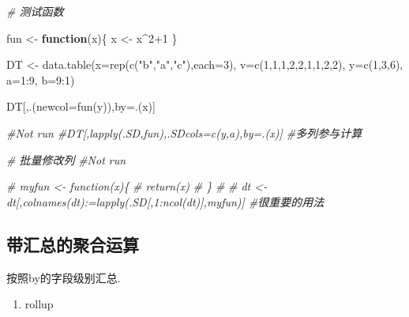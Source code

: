 \documentclass[
]{book}
\newenvironment{Shaded}{\begin{snugshade}}{\end{snugshade}}
\newcommand{\AttributeTok}[1]{\textcolor[rgb]{0.77,0.63,0.00}{#1}}
\newcommand{\CommentTok}[1]{\textcolor[rgb]{0.56,0.35,0.01}{\textit{#1}}}
\newcommand{\ControlFlowTok}[1]{\textcolor[rgb]{0.13,0.29,0.53}{\textbf{#1}}}
\newcommand{\DecValTok}[1]{\textcolor[rgb]{0.00,0.00,0.81}{#1}}
\newcommand{\FunctionTok}[1]{\textcolor[rgb]{0.00,0.00,0.00}{#1}}
\newcommand{\NormalTok}[1]{#1}
\newcommand{\OtherTok}[1]{\textcolor[rgb]{0.56,0.35,0.01}{#1}}
\newcommand{\SpecialCharTok}[1]{\textcolor[rgb]{0.00,0.00,0.00}{#1}}
\newcommand{\StringTok}[1]{\textcolor[rgb]{0.31,0.60,0.02}{#1}}
\providecommand{\tightlist}{%
  \setlength{\itemsep}{0pt}\setlength{\parskip}{0pt}}
\begin{document}
\begin{Shaded}
\begin{Highlighting}[]
\CommentTok{\# 测试函数}

\NormalTok{fun }\OtherTok{\textless{}{-}} \ControlFlowTok{function}\NormalTok{(x)\{}
\NormalTok{  x }\OtherTok{\textless{}{-}}\NormalTok{ x}\SpecialCharTok{\^{}}\DecValTok{2}\SpecialCharTok{+}\DecValTok{1}
\NormalTok{\}}

\NormalTok{DT }\OtherTok{\textless{}{-}}  \FunctionTok{data.table}\NormalTok{(}\AttributeTok{x=}\FunctionTok{rep}\NormalTok{(}\FunctionTok{c}\NormalTok{(}\StringTok{"b"}\NormalTok{,}\StringTok{"a"}\NormalTok{,}\StringTok{"c"}\NormalTok{),}\AttributeTok{each=}\DecValTok{3}\NormalTok{), }\AttributeTok{v=}\FunctionTok{c}\NormalTok{(}\DecValTok{1}\NormalTok{,}\DecValTok{1}\NormalTok{,}\DecValTok{1}\NormalTok{,}\DecValTok{2}\NormalTok{,}\DecValTok{2}\NormalTok{,}\DecValTok{1}\NormalTok{,}\DecValTok{1}\NormalTok{,}\DecValTok{2}\NormalTok{,}\DecValTok{2}\NormalTok{), }\AttributeTok{y=}\FunctionTok{c}\NormalTok{(}\DecValTok{1}\NormalTok{,}\DecValTok{3}\NormalTok{,}\DecValTok{6}\NormalTok{), }\AttributeTok{a=}\DecValTok{1}\SpecialCharTok{:}\DecValTok{9}\NormalTok{, }\AttributeTok{b=}\DecValTok{9}\SpecialCharTok{:}\DecValTok{1}\NormalTok{)}

\NormalTok{DT[,.(}\AttributeTok{newcol=}\FunctionTok{fun}\NormalTok{(y)),by}\OtherTok{=}\NormalTok{.(x)]}

\CommentTok{\#Not run}
\CommentTok{\#DT[,lapply(.SD,fun),.SDcols=c(\textquotesingle{}y\textquotesingle{},\textquotesingle{}a\textquotesingle{}),by=.(x)] \#多列参与计算}


\CommentTok{\# 批量修改列}
\CommentTok{\#Not run}

\CommentTok{\# myfun \textless{}{-} function(x)\{}
\CommentTok{\#   return(x)}
\CommentTok{\# \}}
\CommentTok{\# }
\CommentTok{\# dt \textless{}{-} dt[,colnames(dt):=lapply(.SD[,1:ncol(dt)],myfun)] \#很重要的用法}
\end{Highlighting}
\end{Shaded}

\hypertarget{ux5e26ux6c47ux603bux7684ux805aux5408ux8fd0ux7b97}{%
\subsection{带汇总的聚合运算}\label{ux5e26ux6c47ux603bux7684ux805aux5408ux8fd0ux7b97}}

按照by的字段级别汇总.

\begin{enumerate}
\def\labelenumi{\arabic{enumi}.}
\tightlist
\item
  rollup
\end{enumerate}
\end{document}

